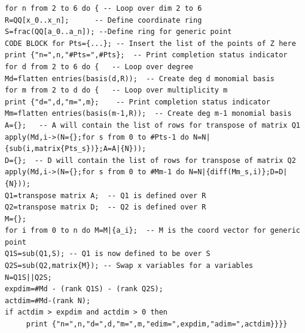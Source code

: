 \documentclass[12pt]{amsart}
\numberwithin{equation}{section}
\theoremstyle{definition}
\begin{document}
\begin{verbatim}
for n from 2 to 6 do { -- Loop over dim 2 to 6
R=QQ[x_0..x_n];      -- Define coordinate ring
S=frac(QQ[a_0..a_n]); --Define ring for generic point 
CODE BLOCK for Pts={...}; -- Insert the list of the points of Z here
print {"n=",n,"#Pts=",#Pts};  -- Print completion status indicator
for d from 2 to 6 do {   -- Loop over degree
Md=flatten entries(basis(d,R));  -- Create deg d monomial basis
for m from 2 to d do {   -- Loop over multiplicity m
print {"d=",d,"m=",m};    -- Print completion status indicator
Mm=flatten entries(basis(m-1,R));  -- Create deg m-1 monomial basis
A={};   -- A will contain the list of rows for transpose of matrix Q1
apply(Md,i->(N={};for s from 0 to #Pts-1 do N=N|{sub(i,matrix{Pts_s})};A=A|{N}));
D={};  -- D will contain the list of rows for transpose of matrix Q2
apply(Md,i->(N={};for s from 0 to #Mm-1 do N=N|{diff(Mm_s,i)};D=D|{N}));
Q1=transpose matrix A;  -- Q1 is defined over R
Q2=transpose matrix D;  -- Q2 is defined over R
M={};
for i from 0 to n do M=M|{a_i};  -- M is the coord vector for generic point
Q1S=sub(Q1,S); -- Q1 is now defined to be over S
Q2S=sub(Q2,matrix{M}); -- Swap x variables for a variables
N=Q1S||Q2S;  
expdim=#Md - (rank Q1S) - (rank Q2S);
actdim=#Md-(rank N);
if actdim > expdim and actdim > 0 then 
     print {"n=",n,"d=",d,"m=",m,"edim=",expdim,"adim=",actdim}}}}
\end{verbatim}
\end{document}
